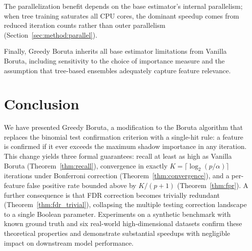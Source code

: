\documentclass[runningheads]{llncs}
\begin{document}
The parallelization benefit depends on the base estimator's internal parallelism; when tree training saturates all CPU cores, the dominant speedup comes from reduced iteration counts rather than outer parallelism (Section~\ref{sec:method:parallel}).


Finally, Greedy Boruta inherits all base estimator limitations from Vanilla Boruta, including sensitivity to the choice of importance measure and the assumption that tree-based ensembles adequately capture feature relevance.

\section{Conclusion}
\label{sec:conclusion}

We have presented Greedy Boruta, a modification to the Boruta algorithm that replaces the binomial test confirmation criterion with a single-hit rule: a feature is confirmed if it ever exceeds the maximum shadow importance in any iteration. This change yields three formal guarantees: recall at least as high as Vanilla Boruta (Theorem~\ref{thm:recall}), convergence in exactly $K = \lceil \log_2(p/\alpha) \rceil$ iterations under Bonferroni correction (Theorem~\ref{thm:convergence}), and a per-feature false positive rate bounded above by $K/(p+1)$ (Theorem~\ref{thm:fpr}). A further consequence is that FDR correction becomes trivially redundant (Theorem~\ref{thm:fdr_trivial}), collapsing the multiple testing correction landscape to a single Boolean parameter. Experiments on a synthetic benchmark with known ground truth and six real-world high-dimensional datasets confirm these theoretical properties and demonstrate substantial speedups with negligible impact on downstream model performance.
\end{document}
